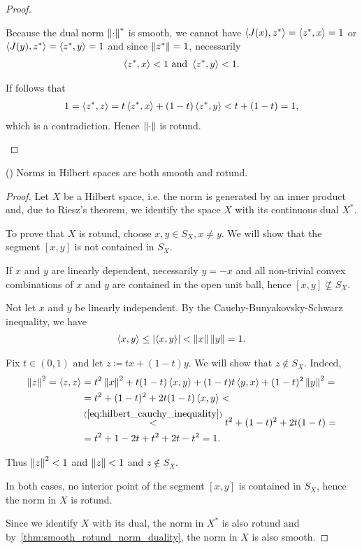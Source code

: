 \begin{proof}
\begin{enumerate}
    Because the dual norm $\left\Vert \cdot \right\Vert^*$ is smooth, we cannot have $\left\langle J(x), z^* \right\rangle =  \left\langle z^*, x \right\rangle = 1$ or $\left\langle J(y), z^* \right\rangle = \left\langle z^*, y \right\rangle = 1$ and since $\left\Vert z^* \right\Vert = 1$, necessarily
    \begin{align*}
      \left\langle z^*, x \right\rangle < 1 \text{ and } \left\langle z^*, y \right\rangle < 1.
    \end{align*}

    If follows that
    \begin{align*}
      1
      =
      \left\langle z^*, z \right\rangle
      =
      t \left\langle z^*, x \right\rangle + (1-t) \left\langle z^*, y \right\rangle
      <
      t + (1-t)
      =
      1,
    \end{align*}
    which is a contradiction. Hence $\left\Vert \cdot \right\Vert$ is rotund.
  \end{enumerate}
\end{proof}

\begin{proposition}\label{thm:hilbert_space_smooth_rotund}(\cite[exercise 2.37(c)]{Phelps1993})
  Norms in Hilbert spaces are both smooth and rotund.
\end{proposition}
\begin{proof}
  Let $X$ be a Hilbert space, i.e. the norm is generated by an inner product and, due to Riesz's theorem, we identify the space $X$ with its continuous dual $X^*$.

  To prove that $X$ is rotund, choose $x, y \in S_X, x \neq y$. We will show that the segment $[x, y]$ is not contained in $S_X$.

  If $x$ and $y$ are linearly dependent, necessarily $y = -x$ and all non-trivial convex combinations of $x$ and $y$ are contained in the open unit ball, hence $[x, y] \not\subseteq S_X$.

  Not let $x$ and $y$ be linearly independent. By the Cauchy-Bunyakovsky-Schwarz inequality, we have
  \begin{align}\label{eq:hilbert_cauchy_inequality}
    \left\langle x, y \right\rangle \leq \left\vert \left\langle x, y \right\rangle \right\vert < \left\Vert x \right\Vert \left\Vert y \right\Vert = 1.
  \end{align}

  Fix $t \in (0, 1)$ and let $z \coloneqq tx + (1-t)y$. We will show that $z \not\in S_X$. Indeed,
  \begin{align*}
    \left\Vert z \right\Vert^2
    =
    \left\langle z, z \right\rangle
    &=
    t^2 \left\Vert x \right\Vert^2 + t(1-t) \left\langle x, y \right\rangle + (1-t) t \left\langle y, x \right\rangle + (1-t)^2 \left\Vert y \right\Vert^2
    = \\ &=
    t^2 + (1-t)^2 + 2 t(1-t) \left\langle x, y \right\rangle
    < \\ &\overset {(\ref{eq:hilbert_cauchy_inequality})} <
    t^2 + (1-t)^2 + 2 t(1-t)
    = \\ &=
    t^2 + 1 - 2t + t^2 + 2t - t^2
    =
    1.
  \end{align*}

  Thus $\left\Vert z \right\Vert^2 < 1$ and $\left\Vert z \right\Vert < 1$ and $z \not\in S_X$.

  In both cases, no interior point of the segment $[x, y]$ is contained in $S_X$, hence the norm in $X$ is rotund.

  Since we identify $X$ with its dual, the norm in $X^*$ is also rotund and by~\cref{thm:smooth_rotund_norm_duality}, the norm in $X$ is also smooth.
\end{proof}

